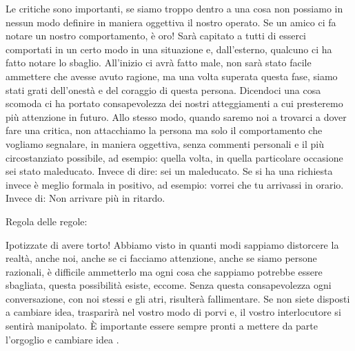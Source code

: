 \documentclass[12pt]{book} %
\begin{document}
Le critiche sono importanti, se siamo troppo dentro a una cosa non possiamo in nessun modo definire in maniera oggettiva
il nostro operato. Se un amico ci fa notare un nostro comportamento, è oro! Sarà capitato a tutti di esserci comportati
in un certo modo in una situazione e, dall'esterno, qualcuno ci ha fatto notare lo sbaglio.
All'inizio ci avrà fatto male, non sarà stato facile ammettere che avesse avuto ragione, ma una
volta superata questa fase, siamo stati grati dell'onestà e del coraggio di questa persona.
Dicendoci una cosa scomoda ci ha portato consapevolezza dei nostri atteggiamenti a cui presteremo più attenzione in
futuro. Allo stesso modo, quando saremo noi a trovarci a dover fare una critica, non attacchiamo la persona ma solo il
comportamento che vogliamo segnalare, in maniera oggettiva, senza commenti personali e il più circostanziato possibile,
ad esempio: quella volta, in quella particolare occasione sei stato maleducato. Invece di dire: sei un maleducato. Se
si ha una richiesta invece è meglio formala in positivo, ad esempio: vorrei che tu arrivassi in orario. Invece di: Non
arrivare più in ritardo.


\bigskip

Regola delle regole:

Ipotizzate di avere torto! Abbiamo visto in quanti modi sappiamo distorcere la realtà, anche noi, anche se ci facciamo
attenzione, anche se siamo persone razionali, è difficile ammetterlo ma ogni cosa che sappiamo potrebbe essere
sbagliata, questa possibilità esiste, eccome. Senza questa consapevolezza ogni conversazione, con noi stessi e gli
atri, risulterà fallimentare. Se non siete disposti a cambiare idea, trasparirà nel vostro modo di porvi e, il vostro
interlocutore si sentirà manipolato. È importante essere sempre pronti a mettere da parte
l'orgoglio e cambiare
idea
.
\end{document}

